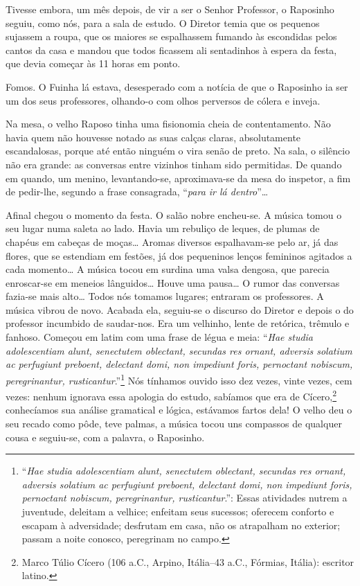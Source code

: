 Tivesse embora, um mês depois, de vir a ser o Senhor Professor, o
Raposinho seguiu, como nós, para a sala de estudo. O Diretor temia que
os pequenos sujassem a roupa, que os maiores se espalhassem fumando às
escondidas pelos cantos da casa e mandou que todos ficassem ali
sentadinhos à espera da festa, que devia começar às 11 horas em ponto.

Fomos. O Fuinha lá estava, desesperado com a notícia de que o Raposinho
ia ser um dos seus professores, olhando-o com olhos perversos de cólera
e inveja.

Na mesa, o velho Raposo tinha uma fisionomia cheia de contentamento. Não
havia quem não houvesse notado as suas calças claras, absolutamente
escandalosas, porque até então ninguém o vira senão de preto. Na sala, o
silêncio não era grande: as conversas entre vizinhos tinham sido
permitidas. De quando em quando, um menino, levantando-se, aproximava-se
da mesa do inspetor, a fim de pedir-lhe, segundo a frase consagrada,
``\emph{para ir lá dentro}''\ldots{}

Afinal chegou o momento da festa. O salão nobre encheu-se. A música
tomou o seu lugar numa saleta ao lado. Havia um rebuliço de leques, de
plumas de chapéus em cabeças de moças\ldots{} Aromas diversos espalhavam-se
pelo ar, já das flores, que se estendiam em festões, já dos pequeninos
lenços femininos agitados a cada momento\ldots{} A música tocou em surdina
uma valsa dengosa, que parecia enroscar-se em meneios lânguidos\ldots{} Houve
uma pausa\ldots{} O rumor das conversas fazia-se mais alto\ldots{} Todos nós
tomamos lugares; entraram os professores. A música vibrou de novo.
Acabada ela, seguiu-se o discurso do Diretor e depois o do professor
incumbido de saudar-nos. Era um velhinho, lente de retórica, trêmulo e
fanhoso. Começou em latim com uma frase de légua e meia: ``\emph{Hae
studia adolescentiam alunt, senectutem oblectant, secundas res ornant,
adversis solatium ac perfugiunt preboent, delectant domi, non impediunt
foris, pernoctant nobiscum, peregrinantur, rusticantur}.''\footnote{``\emph{Hae
  studia adolescentiam alunt, senectutem oblectant, secundas res ornant,
  adversis solatium ac perfugiunt preboent, delectant domi, non
  impediunt foris, pernoctant nobiscum, peregrinantur, rusticantur}.'':
  Essas atividades nutrem a juventude, deleitam a velhice; enfeitam seus
  sucessos; oferecem conforto e escapam à adversidade; desfrutam em
  casa, não os atrapalham no exterior; passam a noite conosco,
  peregrinam no campo.} Nós tínhamos ouvido isso dez vezes, vinte vezes,
cem vezes: nenhum ignorava essa apologia do estudo, sabíamos que era de
Cícero,\footnote{Marco Túlio Cícero (106 a.C., Arpino, Itália--43 a.C.,
  Fórmias, Itália): escritor latino.} conhecíamos sua análise gramatical
e lógica, estávamos fartos dela! O velho deu o seu recado como pôde,
teve palmas, a música tocou uns compassos de qualquer cousa e seguiu-se,
com a palavra, o Raposinho.

